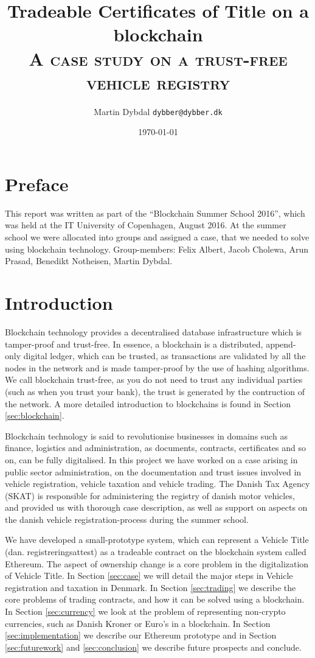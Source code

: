 \documentclass[oneside,a4paper,10pts,article]{memoir}
\title{Tradeable Certificates of Title on a blockchain \\
 {\normalfont\normalsize\scshape A case study on a trust-free vehicle registry}
}
\author{Martin Dybdal \texttt{dybber@dybber.dk}}
\date{\today}
\begin{document}
\maketitle

\chapter{Preface}
This report was written as part of the ``Blockchain Summer School
2016'', which was held at the IT University of Copenhagen, August
2016. At the summer school we were allocated into groups and assigned
a case, that we needed to solve using blockchain
technology. Group-members: Felix Albert, Jacob Cholewa, Arun Prasad,
Benedikt Notheisen, Martin Dybdal.

\chapter{Introduction}
Blockchain technology provides a decentralised database infrastructure
which is tamper-proof and trust-free. In essence, a blockchain is a
distributed, append-only digital ledger, which can be trusted, as
transactions are validated by all the nodes in the network and is made
tamper-proof by the use of hashing algorithms. We call blockchain
trust-free, as you do not need to trust any individual parties (such
as when you trust your bank), the trust is generated by the
contruction of the network. A more detailed introduction to
blockchains is found in Section \ref{sec:blockchain}.

Blockchain technology is said to revolutionise businesses in domains
such as finance, logistics and administration, as documents,
contracts, certificates and so on, can be fully digitalised. In this
project we have worked on a case arising in public sector
administration, on the documentation and trust issues involved in
vehicle registration, vehicle taxation and vehicle trading. The Danish
Tax Agency (SKAT) is responsible for administering the registry of
danish motor vehicles, and provided us with thorough case description,
as well as support on aspects on the danish vehicle
registration-process during the summer school.

We have developed a small-prototype system, which can represent a
Vehicle Title (dan. registreringsattest) as a tradeable contract on
the blockchain system called Ethereum. The aspect of ownership change
is a core problem in the digitalization of Vehicle Title. In Section
\ref{sec:case} we will detail the major steps in Vehicle registration
and taxation in Denmark. In Section \ref{sec:trading} we describe the
core problems of trading contracts, and how it can be solved using a
blockchain. In Section \ref{sec:currency} we look at the problem of
representing non-crypto currencies, such as Danish Kroner or Euro's in
a blockchain. In Section \ref{sec:implementation} we describe our
Ethereum prototype and in Section \ref{sec:futurework} and
\ref{sec:conclusion} we describe future prospects and conclude.
\end{document}
